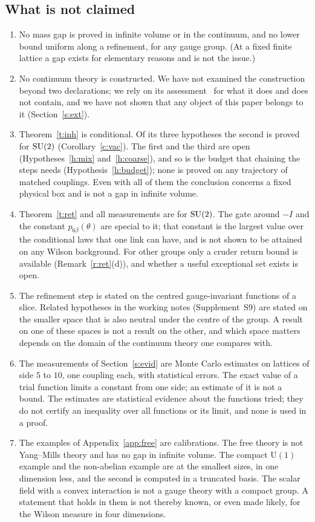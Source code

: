 \subsection{What is not claimed}\label{s:not}
\begin{enumerate}
\item No mass gap is proved in infinite volume or in the continuum, and no lower bound uniform along a
refinement, for any gauge group. (At a fixed finite lattice a gap exists for elementary reasons and is not
the issue.)
\item No continuum theory is constructed. We have not examined the construction~\cite{OAI} beyond two
declarations; we rely on its assessment~\cite{YMG} for what it does and does not contain, and we have not
shown that any object of this paper belongs to it (Section~\ref{s:ext}).
\item Theorem~\ref{t:inh} is conditional. Of its three hypotheses the second is proved for $\mathrm{SU}(2)$
(Corollary~\ref{c:vac}). The first and the third are open (Hypotheses~\ref{h:mix} and~\ref{h:coarse}), and so
is the budget that chaining the steps needs (Hypothesis~\ref{h:budget}); none is proved on any trajectory of
matched couplings. Even with all of them the conclusion concerns a fixed physical box and is not a gap in
infinite volume.
\item Theorem~\ref{t:ret} and all measurements are for $\mathrm{SU}(2)$. The gate around $-I$ and the constant $p_{6\beta}(\theta)$
are special to it; that constant is the largest value over the conditional laws that one link can have, and
is not shown to be attained on any Wilson background. For other groups only a cruder return bound is available (Remark~\ref{r:ret}(d)), and
whether a useful exceptional set exists is open.
\item The refinement step is stated on the centred gauge-invariant functions of a slice. Related hypotheses
in the working notes (Supplement~S9) are stated on the smaller space that is also neutral under the centre of the group. A
result on one of these spaces is not a result on the other, and which space matters depends on the domain of
the continuum theory one compares with.
\item The measurements of Section~\ref{s:evid} are Monte Carlo estimates on lattices of side $5$ to $10$,
one coupling each, with statistical errors. The exact value of a trial function limits a constant from one
side; an estimate of it is not a bound. The estimates are statistical evidence about the functions tried; they do
not certify an inequality over all functions or its limit, and none is
used in a proof.
\item The examples of Appendix~\ref{app:free} are calibrations. The free theory is not Yang--Mills theory and
has no gap in infinite volume. The compact $\mathrm U(1)$ example and the non-abelian example are at the
smallest sizes, in one dimension less, and the second is computed in a truncated basis. The scalar field
with a convex interaction is not a gauge theory with a compact group. A statement that holds in them is not
thereby known, or even made likely, for the Wilson measure in four dimensions.
\end{enumerate}

